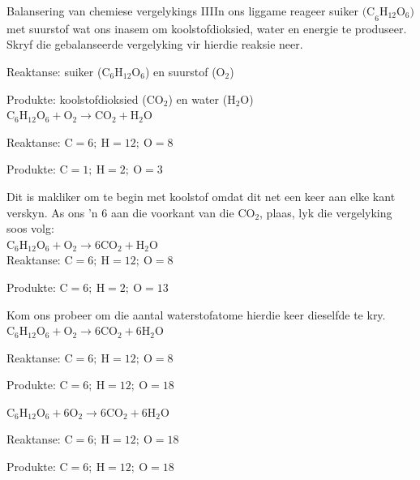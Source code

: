 \begin{wex}{Balansering van chemiese vergelykings III}{In ons liggame reageer suiker ${\text{(C}_{6}\text{H}_{12}\text{O}_{6}\text{)}}$ met suurstof wat ons inasem om koolstofdioksied, water en energie te produseer. Skryf die gebalanseerde vergelyking vir hierdie reaksie neer.}
{

Reaktanse: suiker (${\text{C}_{6}\text{H}_{12}\text{O}_{6}}$) en suurstof (${\text{O}_{2}}$)

Produkte: koolstofdioksied (${\text{CO}_{2}}$) en water (${\text{H}_{2}\text{O}}$)\\

    $\text{C}_{6}\text{H}_{12}\text{O}_{6} + \text{O}_{2} \rightarrow \text{CO}_{2} + \text{H}_{2}\text{O}$

   Reaktanse: $\text{C} = 6;~ \text{H} = 12; ~\text{O} = 8$

   Produkte: $\text{C} = 1;~ \text{H} = 2; ~\text{O} = 3$

Dit is makliker om te begin met koolstof omdat dit net een keer aan elke kant verskyn. As ons 'n $6$ aan die                                      voorkant van die ${\text{CO}_{2}}$, plaas, lyk die vergelyking soos volg:\\
    $\text{C}_{6}\text{H}_{12}\text{O}_{6} + \text{O}_{2} \rightarrow 6\text{CO}_{2} + \text{H}_{2}\text{O}$\\

   Reaktanse: $\text{C} = 6;~ \text{H} = 12; ~\text{O} = 8$

   Produkte: $\text{C} = 6;~ \text{H} = 2; ~\text{O} = 13$

Kom ons probeer om die aantal waterstofatome hierdie keer dieselfde te kry.\\
    $\text{C}_{6}\text{H}_{12}\text{O}_{6} + \text{O}_{2} \rightarrow 6\text{CO}_{2} + 6\text{H}_{2}\text{O}$

   Reaktanse: $\text{C} = 6;~ \text{H} = 12; ~\text{O} = 8$

   Produkte: $\text{C} = 6;~ \text{H} = 12; ~\text{O} = 18$

  $\text{C}_{6}\text{H}_{12}\text{O}_{6} + 6\text{O}_{2} \rightarrow 6\text{CO}_{2} + 6\text{H}_{2}\text{O}$

   Reaktanse: $\text{C} = 6;~ \text{H} = 12; ~\text{O} = 18$

   Produkte: $\text{C} = 6;~ \text{H} = 12; ~\text{O} = 18$
}
\end{wex}
